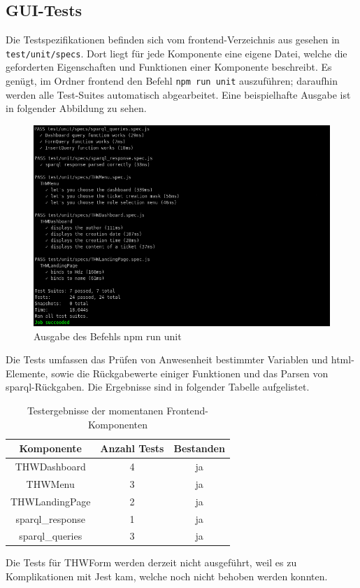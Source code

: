 \documentclass[a4paper,11pt,oneside, titlepage]{article}
\begin{document}
\subsection{GUI-Tests}
Die Testspezifikationen befinden sich vom frontend-Verzeichnis aus gesehen in \verb+test/unit/specs+.
Dort liegt für jede Komponente eine eigene Datei, welche die geforderten Eigenschaften und Funktionen
einer Komponente beschreibt. Es genügt, im Ordner frontend den Befehl \verb+npm run unit+ auszuführen; daraufhin werden alle Test-Suites automatisch abgearbeitet. Eine beispielhafte Ausgabe ist in folgender Abbildung zu sehen.
\begin{figure}[htpb]
\centering
\includegraphics[width=0.8\linewidth]{test}
\caption{Ausgabe des Befehls npm run unit}
\label{fig:npmtest}
\end{figure}
Die Tests umfassen das Prüfen von Anwesenheit bestimmter Variablen und html-Elemente, sowie die Rückgabewerte einiger Funktionen und das Parsen von sparql-Rückgaben.
Die Ergebnisse sind in folgender Tabelle aufgelistet.
\begin{table}[htpb]
\centering
\label{tab:test}
\begin{tabular}{c | c | c}
Komponente & Anzahl Tests & Bestanden \\
\hline
THWDashboard & 4 & ja \\
THWMenu & 3 & ja \\
THWLandingPage & 2 & ja\\
sparql\_response & 1 & ja\\
sparql\_queries & 3 & ja\\
\end{tabular}
\caption{Testergebnisse der momentanen Frontend-Komponenten}
\end{table}
Die Tests für THWForm werden derzeit nicht ausgeführt, weil es zu Komplikationen mit Jest kam, welche noch nicht behoben werden konnten.
\end{document}
